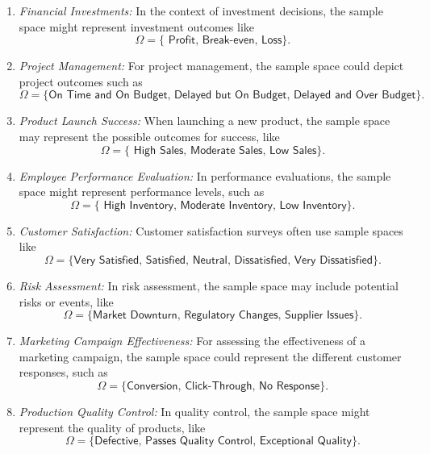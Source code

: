 \documentclass{tufte-handout}
\begin{document}
\begin{enumerate}
\item \textit{Financial Investments:}
In the context of investment decisions, the sample space might represent investment outcomes like
 $$\Omega = \{\textsf{ Profit, Break-even, Loss}\}.$$
 
\item \textit{Project Management:}
For project management, the sample space could depict project outcomes such as
 $$\Omega = \{\textsf{On Time and On Budget, Delayed but On Budget, Delayed and Over Budget}\}.$$
 
\item \textit{Product Launch Success:}
When launching a new product, the sample space may represent the possible outcomes for success, like
 $$\Omega = \{\textsf{ High Sales, Moderate Sales, Low Sales}\}.$$

\item \textit{Employee Performance Evaluation:}
In performance evaluations, the sample space might represent performance levels, such as
 $$\Omega = \{\textsf{ High Inventory, Moderate Inventory, Low Inventory}\}.$$

\item \textit{Customer Satisfaction:}
Customer satisfaction surveys often use sample spaces like 
 $$\Omega = \{\textsf{Very Satisfied, Satisfied, Neutral, Dissatisfied, Very Dissatisfied}\}.$$

\item \textit{Risk Assessment:}
In risk assessment, the sample space may include potential risks or events, like 
 $$\Omega = \{\textsf{Market Downturn, Regulatory Changes, Supplier Issues}\}.$$

\item \textit{Marketing Campaign Effectiveness:}
For assessing the effectiveness of a marketing campaign, the sample space could represent the different customer responses, such as  $$\Omega = \{\textsf{Conversion, Click-Through, No Response}\}.$$
 
\item \textit{Production Quality Control:}
In quality control, the sample space might represent the quality of products, like
 $$\Omega = \{\textsf{Defective, Passes Quality Control, Exceptional Quality}\}.$$


\end{enumerate}
\end{document}
